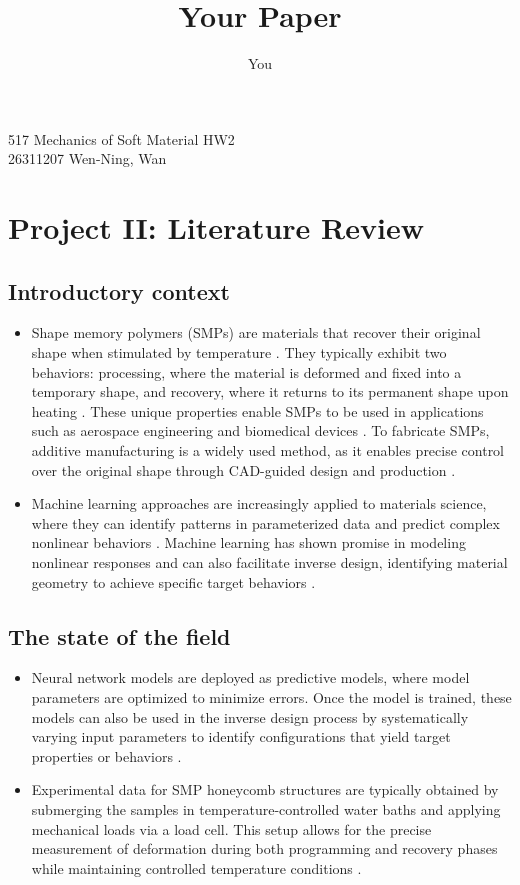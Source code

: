 \documentclass{elsarticle}
\title{Your Paper}
\author{You}
\begin{document}
\begin{center}
    517 Mechanics of Soft Material HW2\\
    26311207 Wen-Ning, Wan
\end{center}
\section{Project II: Literature Review}
\subsection{Introductory context}
\begin{itemize}
    \item Shape memory polymers (SMPs) are materials that recover their original shape when stimulated by temperature \cite{xia2021review}. They typically exhibit two behaviors: processing, where the material is deformed and fixed into a temporary shape, and recovery, where it returns to its permanent shape upon heating \cite{lendlein2002shape}. These unique properties enable SMPs to be used in applications such as aerospace engineering \cite{liu2014shape} and biomedical devices \cite{zhang2014bioactive}. To fabricate SMPs, additive manufacturing is a widely used method, as it enables precise control over the original shape through CAD-guided design and production \cite{shen2024inverse}.
    \item Machine learning approaches are increasingly applied to materials science, where they can identify patterns in parameterized data and predict complex nonlinear behaviors \cite{chen2019machine, garces2021advances}. Machine learning has shown promise in modeling nonlinear responses \cite{liu2019deep} and can also facilitate inverse design, identifying material geometry to achieve specific target behaviors \cite{gu2018bioinspired}.

\end{itemize}

\subsection{The state of the field}
\begin{itemize}
    \item Neural network models are deployed as predictive models, where model parameters are optimized to minimize errors. Once the model is trained, these models can also be used in the inverse design process by systematically varying input parameters to identify configurations that yield target properties or behaviors \cite{park2024deep}.
    \item Experimental data for SMP honeycomb structures are typically obtained by submerging the samples in temperature-controlled water baths and applying mechanical loads via a load cell. This setup allows for the precise measurement of deformation during both programming and recovery phases while maintaining controlled temperature conditions \cite{ledari2025experimental}.
\end{itemize}
\end{document}
